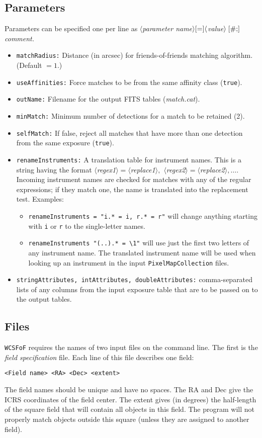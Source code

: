 \documentclass[11pt,preprint,flushrt]{aastex}
\begin{document}
\subsection{Parameters}
Parameters can be specified one per line as {\it $\langle$parameter name$\rangle [{\tt=}] \langle$value$\rangle\; [ {\tt \#;}]$ comment.}
\begin{itemize}
\item {\tt matchRadius:} Distance (in arcsec) for friends-of-friends matching algorithm. (Default $=1$.)
\item {\tt useAffinities:} Force matches to be from the same affinity class ({\tt true}).
\item {\tt outName:} Filename for the output FITS tables ({\it match.cat}).
\item {\tt minMatch:} Minimum number of detections for a match to be retained (2).
\item {\tt selfMatch:} If false, reject all matches that have more than one detection from the same exposure ({\tt true}).
\item {\tt renameInstruments:} A translation table for instrument names.  This is a string having the format {\it $\langle$regex1$\rangle=\langle$replace1$\rangle, $ $\langle$regex2$\rangle=\langle$replace2$\rangle, \ldots.$}  Incoming instrument names are checked for matches with any of the regular expressions; if they match one, the name is translated into the replacement test.  Examples:
\begin{itemize}
\item {\tt renameInstruments = "i.* = i, r.* = r"} will change anything starting with {\tt i} or {\tt r} to the single-letter names.
\item {\tt renameInstruments "(..).* = \textbackslash{}1"} will use just the first two letters of any instrument name.  The translated instrument name will be used when looking up an instrument in the input {\tt PixelMapCollection} files.
\end{itemize}
\item {\tt stringAttributes, intAttributes, doubleAttributes:} comma-separated lists of any columns from the input exposure table that are to be passed on to the output tables.
\end{itemize}

\subsection{Files}
\label{infile}
{\tt WCSFoF} requires the names of two input files on the command line.  The first is the {\em field specification} file.  Each line of this file describes one field:
\begin{verbatim}
<Field name> <RA> <Dec> <extent>
\end{verbatim}
The field names should be unique and have no spaces.  The RA and Dec give the ICRS coordinates of the field center.  The extent gives (in degrees) the half-length of the square field that will contain all objects in this field.  The program will not properly match objects outside this square (unless they are assigned to another field).
\end{document}
